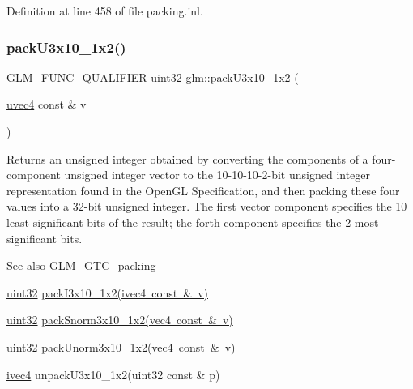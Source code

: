 Definition at line 458 of file packing.\+inl.

\mbox{\label{group__gtc__packing_gaf656d8862628f96b20de7a36eaa1fe56}} 
\subsubsection{\texorpdfstring{packU3x10\_1x2()}{packU3x10\_1x2()}}
{\footnotesize\ttfamily \mbox{\hyperlink{setup_8hpp_a33fdea6f91c5f834105f7415e2a64407}{G\+L\+M\+\_\+\+F\+U\+N\+C\+\_\+\+Q\+U\+A\+L\+I\+F\+I\+ER}} \mbox{\hyperlink{group__gtc__type__precision_ga202b6a53c105fcb7e531f9b443518451}{uint32}} glm\+::pack\+U3x10\+\_\+1x2 (\begin{DoxyParamCaption}\item[{\mbox{\hyperlink{group__core__types_ga1c426d19627b32b14f0089f7f4ba7b1d}{uvec4}} const \&}]{v }\end{DoxyParamCaption})}

Returns an unsigned integer obtained by converting the components of a four-\/component unsigned integer vector to the 10-\/10-\/10-\/2-\/bit unsigned integer representation found in the Open\+GL Specification, and then packing these four values into a 32-\/bit unsigned integer. The first vector component specifies the 10 least-\/significant bits of the result; the forth component specifies the 2 most-\/significant bits.

\begin{DoxySeeAlso}{See also}
\mbox{\hyperlink{group__gtc__packing}{G\+L\+M\+\_\+\+G\+T\+C\+\_\+packing}} 

\mbox{\hyperlink{group__gtc__type__precision_ga202b6a53c105fcb7e531f9b443518451}{uint32}} \mbox{\hyperlink{group__gtc__packing_ga032e18fa5bc5b8f3897104aeb2f1e195}{pack\+I3x10\+\_\+1x2(ivec4 const \& v)}} 

\mbox{\hyperlink{group__gtc__type__precision_ga202b6a53c105fcb7e531f9b443518451}{uint32}} \mbox{\hyperlink{group__gtc__packing_ga0d4157cec37c0312216a7be1cc92df54}{pack\+Snorm3x10\+\_\+1x2(vec4 const \& v)}} 

\mbox{\hyperlink{group__gtc__type__precision_ga202b6a53c105fcb7e531f9b443518451}{uint32}} \mbox{\hyperlink{group__gtc__packing_ga2cf2d11b40bd48639110456fd74c2e33}{pack\+Unorm3x10\+\_\+1x2(vec4 const \& v)}} 

\mbox{\hyperlink{group__core__types_gaa4560ddc50320ea8f8a70d5c9c249fea}{ivec4}} unpack\+U3x10\+\_\+1x2(uint32 const \& p) 
\end{DoxySeeAlso}


